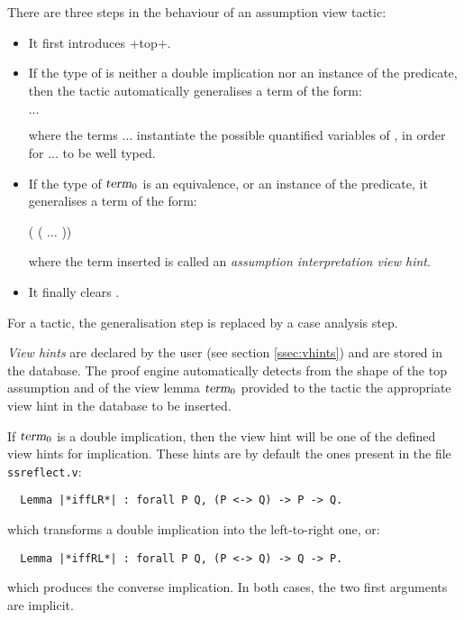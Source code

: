 There are three steps in the behaviour of an assumption view tactic:
\begin{itemize}
\item It first introduces \ssrL+top+.
\item If the type of  is neither a double implication nor
  an instance of the  predicate, then the tactic
  automatically generalises a term of the form:
  
\begin{center}
  \ssrC{(}  $\dots$ \ssrC{)}
\end{center}
  
  where the terms  $\dots$  instantiate the
  possible quantified variables of , in order for
  \ssrC{(}  $\dots$   to be well typed.
\item If the type of $\ssrN[0]{term}$ is an equivalence, or
  an instance of the  predicate, it generalises a term of
  the form:
  \begin{center}
  ( (  $\dots$ ))
  \end{center}
  where the term  inserted is called an
  \emph{assumption interpretation view hint}.
\item It finally clears .
\end{itemize}
For a  tactic, the generalisation step is
replaced by a case analysis step.

\emph{View hints} are declared by the user (see section
\ref{ssec:vhints}) and are stored in the  database.
The proof engine automatically
detects from the shape of the top assumption  and of the view
lemma $\ssrN[0]{term}$ provided to the tactic the appropriate view hint in
the database to be inserted.

If $\ssrN[0]{term}$ is a double implication, then the view hint  will
be one of the defined view hints for implication. These hints are by
default the ones present in the file {\tt ssreflect.v}:
\begin{lstlisting}
  Lemma |*iffLR*| : forall P Q, (P <-> Q) -> P -> Q.
\end{lstlisting}
which transforms a double  implication into the left-to-right one, or:
\begin{lstlisting}
  Lemma |*iffRL*| : forall P Q, (P <-> Q) -> Q -> P.
\end{lstlisting}
which produces the converse implication. In both cases, the two first
 arguments are implicit.

